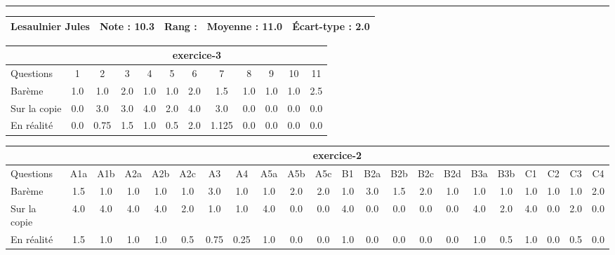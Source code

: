 \documentclass[a4paper, landscape, 10pt]{article}
\begin{document}
\begin{minipage}{\textwidth}
  \end{minipage}
  \vspace{0.3cm}
  \hrule
  \vspace{0.3cm}

  \begin{minipage}{\textwidth}
    { \bf
    \begin{tabular}{|c|*{4}{c|}}
    \hline
      Lesaulnier Jules & Note : 10.3 & Rang :  & Moyenne : 11.0 & \'Ecart-type : 2.0 \\
    \hline
    \end{tabular}
    }
    
      \begin{tabular}{|l|*{ 11 }{c|}}
        \hline
        & \multicolumn{ 11 }{c|}{ exercice-3 } \\
        \hline
        Questions & 1&2&3&4&5&6&7&8&9&10&11 \\
        \hline
        Barème & 1.0&1.0&2.0&1.0&1.0&2.0&1.5&1.0&1.0&1.0&2.5 \\
        \hline
        Sur la copie & 0.0&3.0&3.0&4.0&2.0&4.0&3.0&0.0&0.0&0.0&0.0 \\
        \hline
        En réalité & 0.0&0.75&1.5&1.0&0.5&2.0&1.125&0.0&0.0&0.0&0.0 \\
        \hline
      \end{tabular}
    
      \begin{tabular}{|l|*{ 21 }{c|}}
        \hline
        & \multicolumn{ 21 }{c|}{ exercice-2 } \\
        \hline
        Questions & A1a&A1b&A2a&A2b&A2c&A3&A4&A5a&A5b&A5c&B1&B2a&B2b&B2c&B2d&B3a&B3b&C1&C2&C3&C4 \\
        \hline
        Barème & 1.5&1.0&1.0&1.0&1.0&3.0&1.0&1.0&2.0&2.0&1.0&3.0&1.5&2.0&1.0&1.0&1.0&1.0&1.0&1.0&2.0 \\
        \hline
        Sur la copie & 4.0&4.0&4.0&4.0&2.0&1.0&1.0&4.0&0.0&0.0&4.0&0.0&0.0&0.0&0.0&4.0&2.0&4.0&0.0&2.0&0.0 \\
        \hline
        En réalité & 1.5&1.0&1.0&1.0&0.5&0.75&0.25&1.0&0.0&0.0&1.0&0.0&0.0&0.0&0.0&1.0&0.5&1.0&0.0&0.5&0.0 \\
        \hline
      \end{tabular}
    

\end{minipage}
\end{document}

